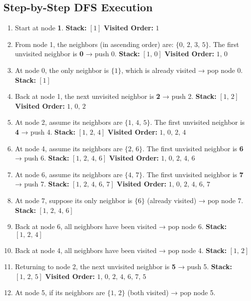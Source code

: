 \documentclass[11pt]{article}
\begin{document}
\subsection*{Step-by-Step DFS Execution}
\begin{enumerate}
    \item Start at node \textbf{1}.
          \textbf{Stack:} \([1]\)
          \textbf{Visited Order:} \(1\)
    \item From node 1, the neighbors (in ascending order) are: \(\{0,\,2,\,3,\,5\}\).
          The first unvisited neighbor is \textbf{0} → push 0.
          \textbf{Stack:} \([1,\,0]\)
          \textbf{Visited Order:} \(1,\,0\)
    \item At node 0, the only neighbor is \(\{1\}\), which is already visited → pop node 0.
          \textbf{Stack:} \([1]\)
    \item Back at node 1, the next unvisited neighbor is \textbf{2} → push 2.
          \textbf{Stack:} \([1,\,2]\)
          \textbf{Visited Order:} \(1,\,0,\,2\)
    \item At node 2, assume its neighbors are \(\{1,\,4,\,5\}\).
          The first unvisited neighbor is \textbf{4} → push 4.
          \textbf{Stack:} \([1,\,2,\,4]\)
          \textbf{Visited Order:} \(1,\,0,\,2,\,4\)
    \item At node 4, assume its neighbors are \(\{2,\,6\}\).
          The first unvisited neighbor is \textbf{6} → push 6.
          \textbf{Stack:} \([1,\,2,\,4,\,6]\)
          \textbf{Visited Order:} \(1,\,0,\,2,\,4,\,6\)
    \item At node 6, assume its neighbors are \(\{4,\,7\}\).
          The first unvisited neighbor is \textbf{7} → push 7.
          \textbf{Stack:} \([1,\,2,\,4,\,6,\,7]\)
          \textbf{Visited Order:} \(1,\,0,\,2,\,4,\,6,\,7\)
    \item At node 7, suppose its only neighbor is \(\{6\}\) (already visited) → pop node 7.
          \textbf{Stack:} \([1,\,2,\,4,\,6]\)
    \item Back at node 6, all neighbors have been visited → pop node 6.
          \textbf{Stack:} \([1,\,2,\,4]\)
    \item Back at node 4, all neighbors have been visited → pop node 4.
          \textbf{Stack:} \([1,\,2]\)
    \item Returning to node 2, the next unvisited neighbor is \textbf{5} → push 5.
          \textbf{Stack:} \([1,\,2,\,5]\)
          \textbf{Visited Order:} \(1,\,0,\,2,\,4,\,6,\,7,\,5\)
    \item At node 5, if its neighbors are \(\{1,\,2\}\) (both visited) → pop node 5.

\end{enumerate}
\end{document}
